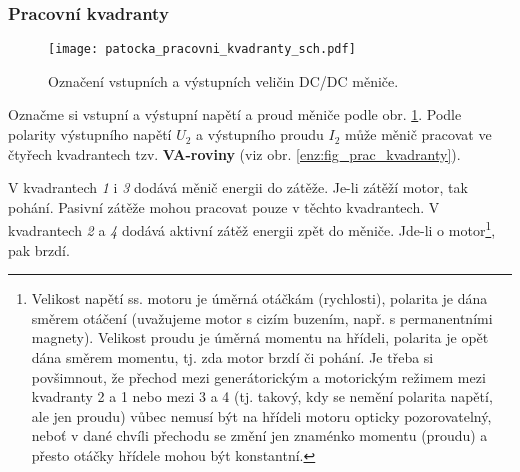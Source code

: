       \subsubsection{Pracovní kvadranty}
         \begin{figure}[ht!]
           \centering
           \texttt{[image: patocka\_pracovni\_kvadranty\_sch.pdf]}
           \caption{Označení vstupních a výstupních veličin DC/DC měniče.}
           \label{enz:fig_prac_kvadranty_sch}
         \end{figure}

         Označme si vstupní a výstupní napětí a proud měniče podle obr.
         \ref{enz:fig_prac_kvadranty_sch}. Podle polarity výstupního napětí $U_2$ a výstupního
         proudu $I_2$ může měnič pracovat ve čtyřech kvadrantech tzv.\textbf{ VA-roviny} (viz obr.
         \ref{enz:fig_prac_kvadranty}).

         V kvadrantech \emph{1} i \emph{3} dodává měnič energii do zátěže. Je-li zátěží motor, tak
         pohání. Pasivní zátěže mohou pracovat pouze v těchto kvadrantech. V kvadrantech \emph{2} a
         \emph{4} dodává aktivní zátěž energii zpět do měniče. Jde-li o motor\footnote{Velikost
         napětí ss. motoru je úměrná otáčkám (rychlosti), polarita je dána směrem otáčení
         (uvažujeme motor s cizím buzením, např. s permanentními magnety). Velikost proudu je
         úměrná momentu na hřídeli, polarita je opět dána směrem momentu, tj. zda motor brzdí či
         pohání. Je třeba si povšimnout, že přechod mezi generátorickým a motorickým režimem mezi
         kvadranty 2 a 1 nebo mezi 3 a 4 (tj. takový, kdy se nemění polarita napětí, ale jen
         proudu) vůbec nemusí být na hřídeli motoru opticky pozorovatelný, neboť v dané chvíli
         přechodu se změní jen znaménko momentu (proudu) a přesto otáčky hřídele mohou být
         konstantní.}, pak brzdí.

